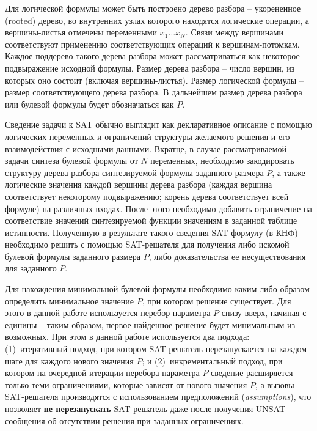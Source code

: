 Для логической формулы может быть построено дерево разбора \--- укорененное (rooted) дерево, во внутренних узлах которого находятся логические операции, а вершины-листья отмечены переменными $x_{1}\ldots x_{N}$. Связи между вершинами соответствуют применению соответствующих операций к вершинам-потомкам. Каждое поддерево такого дерева разбора может рассматриваться как некоторое подвыражение исходной формулы. Размер дерева разбора \--- число вершин, из которых оно состоит (включая вершины-листья). Размер логической формулы \--- размер соответствующего дерева разбора. В дальнейшем размер дерева разбора или булевой формулы будет обозначаться как $P$.

Сведение задачи к SAT обычно выглядит как декларативное описание с помощью логических переменных и ограничений структуры желаемого решения и его взаимодействия с исходными данными. Вкратце, в случае рассматриваемой задачи синтеза булевой формулы от $N$ переменных, необходимо закодировать структуру дерева разбора синтезируемой формулы заданного размера $P$, а также логические значения каждой вершины дерева разбора (каждая вершина соответствует некоторому подвыражению; корень дерева соответствует всей формуле) на различных входах. После этого необходимо добавить ограничение на соответствие значений синтезируемой функции значениям в заданной таблице истинности. Полученную в результате такого сведения SAT-формулу (в КНФ) необходимо решить с помощью SAT-решателя для получения либо искомой булевой формулы заданного размера $P$, либо доказательства ее несуществования для заданного $P$.

Для нахождения минимальной булевой формулы необходимо каким-либо образом определить минимальное значение $P$, при котором решение существует. Для этого в данной работе используется перебор параметра $P$ снизу вверх, начиная с единицы \--- таким образом, первое найденное решение будет минимальным из возможных. При этом в данной работе используется два подхода: (1)~итеративный подход, при котором SAT-решатель перезапускается на каждом шаге для каждого нового значения $P$; и (2)~инкрементальный подход, при котором на очередной итерации перебора параметра $P$ сведение расширяется только теми ограничениями, которые зависят от нового значения $P$, а вызовы SAT-решателя производятся с использованием предположений (\textit{assumptions}), что позволяет \textbf{не перезапускать} SAT-решатель даже после получения UNSAT \--- сообщения об отсутствии решения при заданных ограничениях.

